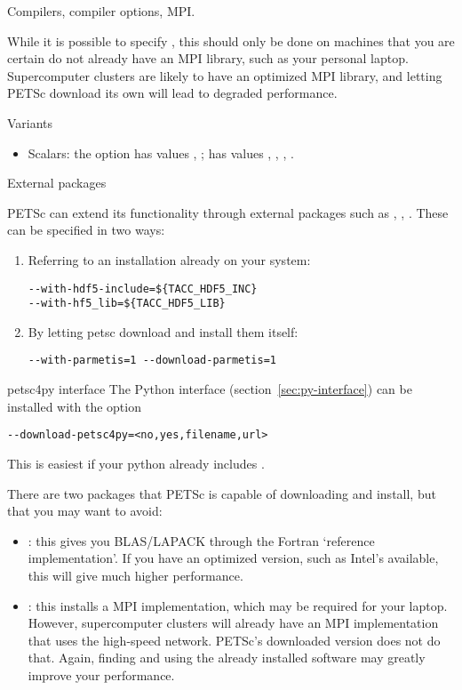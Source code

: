 Compilers, compiler options, MPI.

While it is possible to specify ,
this should only be done on machines that you are certain do not
already have an MPI library, such as your personal
laptop. Supercomputer clusters are likely to have an optimized MPI
library, and letting PETSc download its own will lead to degraded
performance.

 {Variants}

\begin{itemize}
\item Scalars: the option  has values
  , ;  has values
  , , , .
\end{itemize}

 {External packages}
\label{sec:petsc-external}

PETSc can extend its functionality through external packages such as
, , . These can be
specified in two ways:
\begin{enumerate}
\item Referring to an installation already on your system:
\begin{verbatim}
--with-hdf5-include=${TACC_HDF5_INC}
--with-hf5_lib=${TACC_HDF5_LIB}
\end{verbatim}
\item By letting petsc download and install them itself:
\begin{verbatim}
--with-parmetis=1 --download-parmetis=1
\end{verbatim}
\end{enumerate}

\begin{pythonnote}{petsc4py interface}
  The Python interface (section~\ref{sec:py-interface})
  can be installed with the option
\begin{verbatim}
--download-petsc4py=<no,yes,filename,url>
\end{verbatim}
  This is easiest if your python already includes .
\end{pythonnote}

\begin{remark}
  There are two packages that PETSc is capable of downloading and install,
  but that you may want to avoid:
  \begin{itemize}
  \item {}: this gives you BLAS/LAPACK through the
    Fortran `reference implementation'. If you have an optimized
    version, such as Intel's  available, this will give
    much higher performance.
  \item {}: this installs a MPI implementation, which may be
    required for your laptop. However, supercomputer clusters will
    already have an MPI implementation that uses the high-speed
    network. PETSc's downloaded version does not do that. Again,
    finding and using the already installed software may greatly
    improve your performance.
  \end{itemize}
\end{remark}
